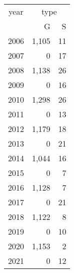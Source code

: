 \footnotesize\begin{tabular}[t]{lrr}
\toprule
\multicolumn{1}{c}{year} & \multicolumn{2}{c}{type} \\
\cmidrule(l{3pt}r{3pt}){1-1} \cmidrule(l{3pt}r{3pt}){2-3}
  & G & S\\
\midrule
2006 & 1,105 & 11\\
2007 & 0 & 17\\
2008 & 1,138 & 26\\
2009 & 0 & 16\\
2010 & 1,298 & 26\\
2011 & 0 & 13\\
2012 & 1,179 & 18\\
2013 & 0 & 21\\
2014 & 1,044 & 16\\
2015 & 0 & 7\\
2016 & 1,128 & 7\\
2017 & 0 & 21\\
2018 & 1,122 & 8\\
2019 & 0 & 10\\
2020 & 1,153 & 2\\
2021 & 0 & 12\\
\bottomrule
\end{tabular}
